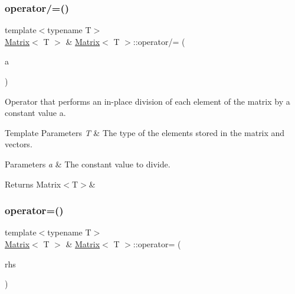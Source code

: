 \subsubsection{\texorpdfstring{operator/=()}{operator/=()}\hspace{0.1cm}{\footnotesize\ttfamily [2/2]}}
{\footnotesize\ttfamily template$<$typename T$>$ \\
\mbox{\hyperlink{classMatrix}{Matrix}}$<$ T $>$ \& \mbox{\hyperlink{classMatrix}{Matrix}}$<$ T $>$\+::operator/= (\begin{DoxyParamCaption}\item[{const T \&}]{a }\end{DoxyParamCaption})\hspace{0.3cm}{\ttfamily [inline]}}



Operator that performs an in-\/place division of each element of the matrix by a constant value {\ttfamily a}. 


\begin{DoxyTemplParams}{Template Parameters}
{\em T} & The type of the elements stored in the matrix and vectors. \\
\hline
\end{DoxyTemplParams}

\begin{DoxyParams}{Parameters}
{\em a} & The constant value to divide. \\
\hline
\end{DoxyParams}
\begin{DoxyReturn}{Returns}
Matrix$<$\+T$>$\& 
\end{DoxyReturn}
\mbox{\label{classMatrix_a01990eb2552555d37c83272125be68e6}} 
\subsubsection{\texorpdfstring{operator=()}{operator=()}\hspace{0.1cm}{\footnotesize\ttfamily [1/2]}}
{\footnotesize\ttfamily template$<$typename T$>$ \\
\mbox{\hyperlink{classMatrix}{Matrix}}$<$ T $>$ \& \mbox{\hyperlink{classMatrix}{Matrix}}$<$ T $>$\+::operator= (\begin{DoxyParamCaption}\item[{const \mbox{\hyperlink{classMatrix}{Matrix}}$<$ T $>$ \&}]{rhs }\end{DoxyParamCaption})\hspace{0.3cm}{\ttfamily [inline]}}



